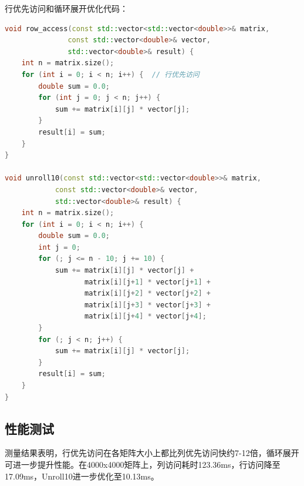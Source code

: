 \documentclass[a4paper,colorlinks=true,linkcolor=blue,urlcolor=blue,citecolor=green,bookmarks=true]{article}
\begin{document}
行优先访问和循环展开优化代码：

\begin{lstlisting}[language=C++]
void row_access(const std::vector<std::vector<double>>& matrix, 
               const std::vector<double>& vector,
               std::vector<double>& result) {
    int n = matrix.size();
    for (int i = 0; i < n; i++) {  // 行优先访问
        double sum = 0.0;
        for (int j = 0; j < n; j++) {
            sum += matrix[i][j] * vector[j];
        }
        result[i] = sum;
    }
}

void unroll10(const std::vector<std::vector<double>>& matrix, 
            const std::vector<double>& vector,
            std::vector<double>& result) {
    int n = matrix.size();
    for (int i = 0; i < n; i++) {
        double sum = 0.0;
        int j = 0;
        for (; j <= n - 10; j += 10) {
            sum += matrix[i][j] * vector[j] +
                   matrix[i][j+1] * vector[j+1] +
                   matrix[i][j+2] * vector[j+2] +
                   matrix[i][j+3] * vector[j+3] +
                   matrix[i][j+4] * vector[j+4];
        }
        for (; j < n; j++) {
            sum += matrix[i][j] * vector[j];
        }
        result[i] = sum;
    }
}
\end{lstlisting}

\subsection{性能测试}

测量结果表明，行优先访问在各矩阵大小上都比列优先访问快约7-12倍，循环展开可进一步提升性能。在4000x4000矩阵上，列访问耗时123.36ms，行访问降至17.09ms，Unroll10进一步优化至10.13ms。
\end{document}
